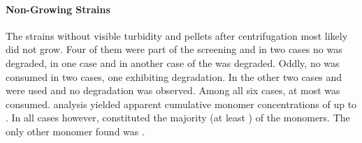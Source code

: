 \paragraph{Non-Growing Strains}
The strains without visible turbidity and pellets after centrifugation most likely did not grow. Four of them were part of the \fur{} screening and in two cases no \fur{} was degraded, in one case  and in another case  of the \fur{} was degraded. Oddly, no \glc{} was consumed in two cases, one exhibiting  \fur{} degradation. In the other two cases \van{} and \laev{} were used and no degradation was observed. Among all six cases, at most  \glc{} was consumed. \Amc{} analysis yielded apparent cumulative monomer concentrations of up to . In all cases however, \glc{} constituted the majority (at least ) of the monomers. The only other monomer found was \man{}.

